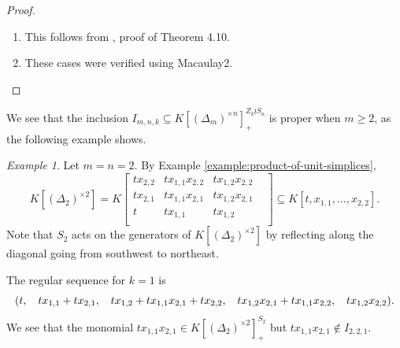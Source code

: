 \documentclass[a4paper,12pt]{amsart}
\theoremstyle{plain}
\theoremstyle{definition}
\theoremstyle{remark}
\newtheorem{example}[theorem]{Example}
\begin{document}
\begin{proof}
\begin{enumerate}
        By point 1, there is a regular sequence of invariants in $K[(\Delta_1)^{\times mn}]$:
        \[
        (t, t(x_{1,1} + x_{2,1} + \cdots + x_{mn,1}), t(x_{1,1}x_{2,1} + x_{1,1}x_{3,1} + \cdots x_{mn - 1,1}x_{mn,1}), \ldots, tx_{1,1}x_{2,1} \cdots x_{mn,1}).
        \]
        
        Since $S_{(m^n)} \subseteq S_{mn}$, this regular sequence is already in $K[(\Delta_1)^{\times mn}]^{S_{(m^n)}}$. Explicitly, for $i = 1, \dots, mn$, the elements of this regular sequence can be written as
        \[
        e_{1,mn,1}^i = \sum_{\lambda \in C_{m, n}(i)}x(\lambda),
        \]
        where $C_{m, n}(i)$ is the set of weak compositions of $i$ whose Young diagram is contained in the rectangle $[0, m] \times [0, n]$. Then, for $i = 1,\dots, mn$,
        \[
        \varphi(e_{1,mn,1}^i) = e_{m, n, 1}^i.
        \]
        The claim follows.
        
        \item This follows from \cite{braun-olsen-statistics}, proof of Theorem 4.10.
        \item These cases were verified using Macaulay2.
    \end{enumerate}
\end{proof}

We see that the inclusion $I_{m, n, k} \subseteq K[(\Delta_m)^{\times n}]_+^{Z_k \wr S_n}$ is proper when $m \geq 2$, as the following example shows.

\begin{example}\label{example:too-many-invariants}
    Let $m = n = 2$. By Example \ref{example:product-of-unit-simplices},
    \[
    K[(\Delta_2)^{\times 2}] = K\begin{bmatrix}
    tx_{2,2} & tx_{1,1}x_{2,2} & tx_{1, 2}x_{2,2}\\
    tx_{2,1} & tx_{1,1}x_{2,1} & tx_{1, 2}x_{2,1} \\
    t & tx_{1,1} & tx_{1, 2} & \\
    \end{bmatrix} \subseteq K[t, x_{1, 1}, \ldots, x_{2, 2}].
    \]
    Note that $S_2$ acts on the generators of $K[(\Delta_2)^{\times 2}]$ by reflecting along the diagonal going from southwest to northeast.
    
    The regular sequence for $k = 1$ is 
    \[
    (t, \hphantom{X} tx_{1, 1} + tx_{2, 1}, \hphantom{X} tx_{1, 2} + tx_{1, 1}x_{2, 1} + tx_{2, 2}, \hphantom{X} tx_{1, 2}x_{2, 1} + tx_{1, 1}x_{2, 2}, \hphantom{X} tx_{1, 2}x_{2, 2}).
    \]
    We see that the monomial $tx_{1,1}x_{2,1} \in K[(\Delta_2)^{\times 2}]^{S_2}_+$ but $tx_{1,1}x_{2,1} \not\in I_{2, 2, 1}$.
\end{example}
\end{document}

